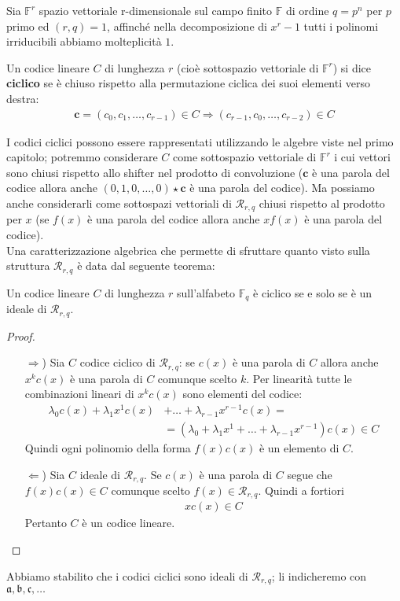 Sia  $\mathbb{F}^{r}$ spazio vettoriale r-dimensionale sul campo finito $\mathbb{F}$ di ordine $q=p^n$ per $p$ primo ed $(r,q) = 1$, affinché nella decomposizione di $x^r-1$ tutti i polinomi irriducibili abbiamo molteplicità $1$.
\begin{definizione}
   Un codice lineare $C$ di lunghezza $r$ (cioè sottospazio vettoriale di $\mathbb{F}^{r}$) si dice {\bf ciclico} se è chiuso rispetto alla permutazione ciclica dei suoi elementi verso destra:
   \begin{align*}
      \mathbf{c} = (c_{0},c_{1}, \dots , c_{r-1}) \in C \Longrightarrow (c_{r-1},c_{0}, \dots , c_{r-2}) \in C 
   \end{align*}
\end{definizione}
\noindent
I codici ciclici possono essere rappresentati utilizzando le algebre viste nel primo capitolo; potremmo considerare $C$ come sottospazio vettoriale di $\mathbb{F}^{r}$ i cui vettori sono chiusi rispetto allo shifter nel prodotto di convoluzione ($\mathbf{c}$ è una parola del codice allora anche $(0,1,0,\dots, 0) \star \mathbf{c}$ è una parola del codice). Ma possiamo anche considerarli come sottospazi vettoriali di $\mathcal{R}_{r, q}$ chiusi rispetto al prodotto per $x$ (se $f(x)$ è una parola del codice allora anche $xf(x)$ è una parola del codice). \\
Una caratterizzazione algebrica che permette di sfruttare quanto visto sulla struttura $\mathcal{R}_{r, q}$ è data dal seguente teorema:
\begin{teorema}
   Un codice lineare $C$ di lunghezza $r$ sull'alfabeto $\mathbb{F}_{q}$ è ciclico se e solo se è un ideale di $\mathcal{R}_{r, q}$. 
\end{teorema}
\begin{proof}
      \begin{itemize}
   \item[$\Rightarrow$)] Sia $C$ codice ciclico di $\mathcal{R}_{r, q}$: se $c(x)$ è una parola di $C$ allora anche $x^{k}c(x)$ è una parola di $C$ comunque scelto $k$. Per linearità tutte le combinazioni lineari di $x^{k}c(x)$ sono elementi del codice:
   \begin{align*}
     \lambda_{0}c(x) + \lambda_{1}x^{1}c(x) &+ \dots + \lambda_{r-1}x^{r-1}c(x) = \\
     &= (\lambda_{0} + \lambda_{1}x^{1} + \dots + \lambda_{r-1}x^{r-1})c(x) \in C
   \end{align*}
   Quindi ogni polinomio della forma $f(x)c(x)$ è un elemento di $C$.
   \item[$\Leftarrow$)] Sia $C$ ideale di $\mathcal{R}_{r, q}$. Se $c(x)$ è una parola di $C$ segue che $f(x)c(x) \in C$ comunque scelto $f(x) \in \mathcal{R}_{r, q}$. Quindi a fortiori 
   \begin{align*}
     xc(x) \in C
   \end{align*}
   Pertanto $C$ è un codice lineare.
\end{itemize}
\end{proof}
\noindent
Abbiamo stabilito che i codici ciclici sono ideali di $\mathcal{R}_{r, q}$; li indicheremo con $\mathfrak{a}, \mathfrak{b}, \mathfrak{c}, \dots$

